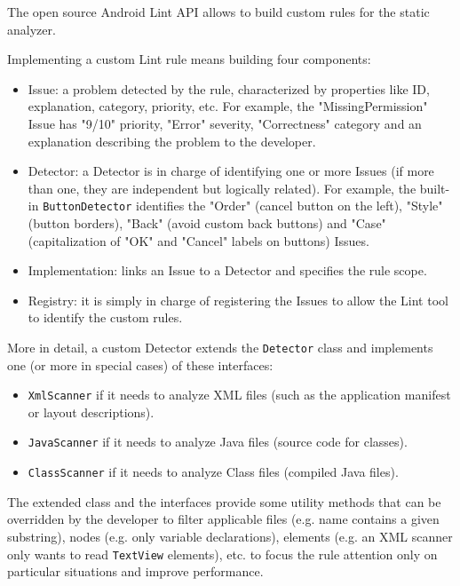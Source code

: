 \documentclass[11pt,a4paper,notitlepage]{article}
\begin{document}
The open source Android Lint API allows to build custom rules for the static analyzer.

Implementing a custom Lint rule means building four components:
\begin{itemize}
	\item Issue: a problem detected by the rule, characterized by properties like ID, explanation, category, priority, etc. For example, the "MissingPermission" Issue has "9/10" priority, "Error" severity, "Correctness" category and an explanation describing the problem to the developer.
	\item Detector: a Detector is in charge of identifying one or more Issues (if more than one, they are independent but logically related). For example, the built-in \texttt{ButtonDetector} identifies the "Order" (cancel button on the left), "Style" (button borders), "Back" (avoid custom back buttons) and "Case" (capitalization of "OK" and "Cancel" labels on buttons) Issues.
	\item Implementation: links an Issue to a Detector and specifies the rule scope.
	\item Registry: it is simply in charge of registering the Issues to allow the Lint tool to identify the custom rules.
\end{itemize}

More in detail, a custom Detector extends the \texttt{Detector} class and implements one (or more in special cases) of these interfaces:
\begin{itemize}
	\item \texttt{XmlScanner} if it needs to analyze XML files (such as the application manifest or layout descriptions).
	\item \texttt{JavaScanner} if it needs to analyze Java files (source code for classes).
	\item \texttt{ClassScanner} if it needs to analyze Class files (compiled Java files).
\end{itemize}

The extended class and the interfaces provide some utility methods that can be overridden by the developer to filter applicable files (e.g. name contains a given substring), nodes (e.g. only variable declarations), elements (e.g. an XML scanner only wants to read \texttt{TextView} elements), etc. to focus the rule attention only on particular situations and improve performance.
\end{document}
